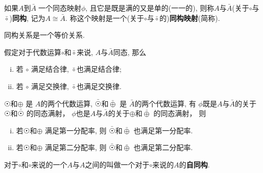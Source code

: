 
\begin{Definition}[同构映射、同构]
如果$A$到$\bar{A}\;${}\;一个同态映射$\phi$, 且它是既是满的又是单的(一一的), 则称$A$与$\bar{A}$(关于$\circ$与$\bar{\circ}$)\textbf{同构}, 记为$A \cong
 \bar{A}$. 称这个映射是一个(关于$\circ$与$\bar{\circ}$的)\textbf{同构映射}(简称).
\end{Definition}

\begin{Proposition}
同构关系是一个等价关系.
\end{Proposition}


\begin{Theorem}
假定对于代数运算$\circ$和$\bar{\circ}$来说, $A$与$\bar{A}$同态, 那么
\begin{enumerate}[i)]
\item 若 $\circ$ 满足结合律, $\bar{\circ}$也满足结合律;
\item 若 $\circ$ 满足交换律, $\bar{\circ}$也满足交换律.
\end{enumerate}
\end{Theorem}

\begin{Theorem}
$ \astrosun $和$ \oplus $ 是 $A$的两个代数运算, 
$ \bar{\astrosun} $和$\bar{\oplus} $ 是 $\bar{A}$的两个代数运算,
有
$\phi$既是$A$与$\bar{A}$的关于$ \astrosun $和$\bar{\astrosun}$ 的同态满射，
$\phi$也是$A$与$\bar{A}$的关于$ \oplus $和$\bar{\oplus}$ 的同态满射，
则 
\begin{enumerate}[i)]
\item 若$ \astrosun$和$ \oplus $  满足第一分配率, 则 $ \bar{\astrosun} $和$\bar{\oplus} $ 也满足第一分配率.
\item 若$ \astrosun$和$\oplus $  满足第二分配率, 则 $ \bar{\astrosun} $和$\bar{\oplus} $ 也满足第二分配率.
\end{enumerate}
\end{Theorem}

\begin{Definition}[自同构]
对于$\circ$和$\circ$来说的一个$A$与$A$之间的\;\;叫做一个对于$\circ$来说的$A$的\textbf{自同构}.
\end{Definition}

